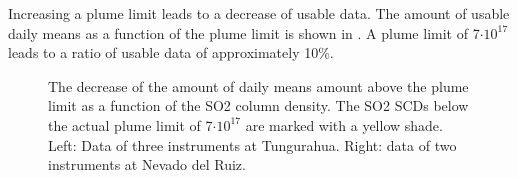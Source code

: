 Increasing a plume limit leads to a decrease of usable data. The amount of usable  daily means as a function of the plume limit is shown in . A plume limit of 7$\cdot10^{17}$ leads to a ratio of usable data of approximately 10\%.
\begin{figure}
	\centering
	\caption{The decrease of the amount of daily means amount above the plume limit as a function of the SO2 column density. The SO2 SCDs below the actual plume limit of 7$\cdot10^{17}$ are marked with a yellow shade. Left: Data of three instruments at Tungurahua. Right: data of two instruments at Nevado del Ruiz.}
	\label{fig:percentageminso2}
\end{figure}

